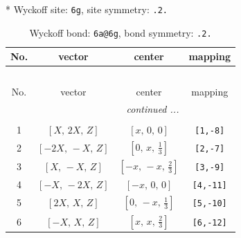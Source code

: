 \documentclass[fleqn,8pt]{jsarticle}
\begin{document}
* Wyckoff site: {\tt 6g}, site symmetry: {\tt .2.}
\renewcommand{\arraystretch}{1.2}
\begin{longtable}{cccc}
\caption{Wyckoff bond: {\tt 6a@6g}, bond symmetry: {\tt .2.}}
 \\
 \hline \hline
No. & vector & center & mapping \\ \hline \endfirsthead

\multicolumn{3}{l}{\tablename\ \thetable{}} \\
 \hline \hline
No. & vector & center & mapping \\ \hline \endhead

 \hline \hline
\multicolumn{3}{r}{\footnotesize\it continued ...} \\ \endfoot

 \hline \hline
\multicolumn{3}{r}{} \\ \endlastfoot

1 & $\left[ X,\, 2 X,\, Z \right]$ & $\left[ x,\, 0,\, 0 \right]$ & {\tt [1,-8]} \\ \hline
2 & $\left[ - 2 X,\, - X,\, Z \right]$ & $\left[ 0,\, x,\, \frac{1}{3} \right]$ & {\tt [2,-7]} \\ \hline
3 & $\left[ X,\, - X,\, Z \right]$ & $\left[ - x,\, - x,\, \frac{2}{3} \right]$ & {\tt [3,-9]} \\ \hline
4 & $\left[ - X,\, - 2 X,\, Z \right]$ & $\left[ - x,\, 0,\, 0 \right]$ & {\tt [4,-11]} \\ \hline
5 & $\left[ 2 X,\, X,\, Z \right]$ & $\left[ 0,\, - x,\, \frac{1}{3} \right]$ & {\tt [5,-10]} \\ \hline
6 & $\left[ - X,\, X,\, Z \right]$ & $\left[ x,\, x,\, \frac{2}{3} \right]$ & {\tt [6,-12]} \\
\end{longtable}
\renewcommand{\arraystretch}{1.2}
\end{document}
